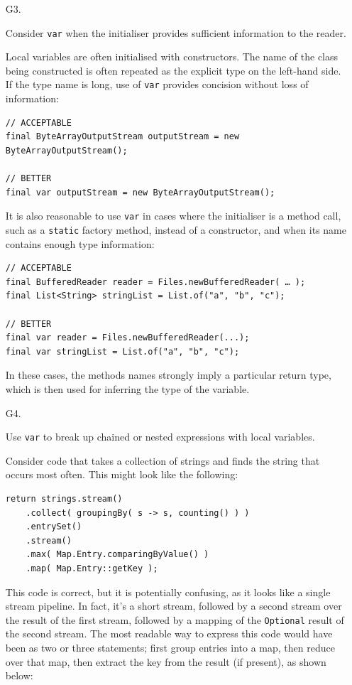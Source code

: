 \documentclass[11pt,a4paper, titlepage, parskip=half, headsepline, footsepline, cleardoublepage=current, headheight=1cm]{scrbook}
\begin{document}
\begin{enumerate}
\item[G3.]{Consider \lstinline|var| when the initialiser provides sufficient information to the reader.

Local variables are often initialised with constructors. The name of the class being constructed is often repeated as the explicit type on the left-hand side. If the type name is long, use of \lstinline|var| provides concision without loss of information:

\begin{lstlisting}
// ACCEPTABLE
final ByteArrayOutputStream outputStream = new ByteArrayOutputStream();

// BETTER
final var outputStream = new ByteArrayOutputStream();
\end{lstlisting}

It is also reasonable to use \lstinline|var| in cases where the initialiser is a method call, such as a \lstinline|static| factory method, instead of a constructor, and when its name contains enough type information:

\begin{lstlisting}
// ACCEPTABLE
final BufferedReader reader = Files.newBufferedReader( … );
final List<String> stringList = List.of("a", "b", "c");

// BETTER
final var reader = Files.newBufferedReader(...);
final var stringList = List.of("a", "b", "c");
\end{lstlisting}

In these cases, the methods names strongly imply a particular return type, which is then used for inferring the type of the variable.}

\item[G4.]{Use \lstinline|var| to break up chained or nested expressions with local variables.

Consider code that takes a collection of strings and finds the string that occurs most often. This might look like the following:

\begin{lstlisting}
return strings.stream()
    .collect( groupingBy( s -> s, counting() ) )
    .entrySet()
    .stream()
    .max( Map.Entry.comparingByValue() )
    .map( Map.Entry::getKey );
\end{lstlisting}

This code is correct, but it is potentially confusing, as it looks like a single stream pipeline. In fact, it’s a short stream, followed by a second stream over the result of the first stream, followed by a mapping of the \lstinline|Optional| result of the second stream. The most readable way to express this code would have been as two or three statements; first group entries into a map, then reduce over that map, then extract the key from the result (if present), as shown below:

}
\end{enumerate}
\end{document}
